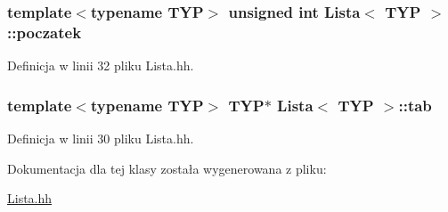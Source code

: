 \hypertarget{class_lista_af6df56635655f71b73c6909032f78f57}{
\subsubsection[{poczatek}]{\setlength{\rightskip}{0pt plus 5cm}template$<$typename TYP$>$ unsigned int {\bf Lista}$<$ TYP $>$::{\bf poczatek}}}
\label{class_lista_af6df56635655f71b73c6909032f78f57}


Definicja w linii 32 pliku Lista.hh.

\hypertarget{class_lista_afdd41700bc843ab4aeb58425b63e4390}{
\subsubsection[{tab}]{\setlength{\rightskip}{0pt plus 5cm}template$<$typename TYP$>$ TYP$\ast$ {\bf Lista}$<$ TYP $>$::{\bf tab}}}
\label{class_lista_afdd41700bc843ab4aeb58425b63e4390}


Definicja w linii 30 pliku Lista.hh.



Dokumentacja dla tej klasy została wygenerowana z pliku:\begin{DoxyCompactItemize}
\item 
\hyperlink{_lista_8hh}{Lista.hh}\end{DoxyCompactItemize}
